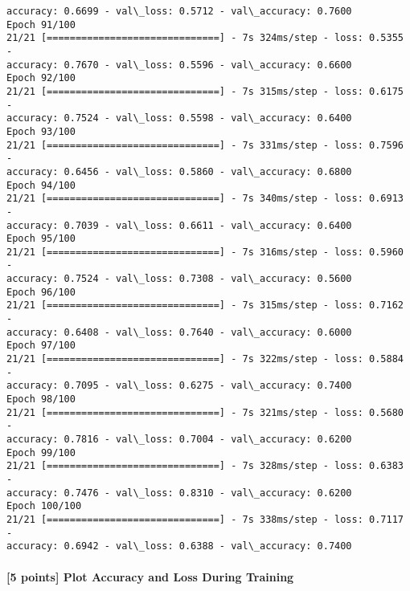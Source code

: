 \documentclass[11pt]{article}
\begin{document}
\begin{Verbatim}[commandchars=\\\{\}]
accuracy: 0.6699 - val\_loss: 0.5712 - val\_accuracy: 0.7600
Epoch 91/100
21/21 [==============================] - 7s 324ms/step - loss: 0.5355 -
accuracy: 0.7670 - val\_loss: 0.5596 - val\_accuracy: 0.6600
Epoch 92/100
21/21 [==============================] - 7s 315ms/step - loss: 0.6175 -
accuracy: 0.7524 - val\_loss: 0.5598 - val\_accuracy: 0.6400
Epoch 93/100
21/21 [==============================] - 7s 331ms/step - loss: 0.7596 -
accuracy: 0.6456 - val\_loss: 0.5860 - val\_accuracy: 0.6800
Epoch 94/100
21/21 [==============================] - 7s 340ms/step - loss: 0.6913 -
accuracy: 0.7039 - val\_loss: 0.6611 - val\_accuracy: 0.6400
Epoch 95/100
21/21 [==============================] - 7s 316ms/step - loss: 0.5960 -
accuracy: 0.7524 - val\_loss: 0.7308 - val\_accuracy: 0.5600
Epoch 96/100
21/21 [==============================] - 7s 315ms/step - loss: 0.7162 -
accuracy: 0.6408 - val\_loss: 0.7640 - val\_accuracy: 0.6000
Epoch 97/100
21/21 [==============================] - 7s 322ms/step - loss: 0.5884 -
accuracy: 0.7095 - val\_loss: 0.6275 - val\_accuracy: 0.7400
Epoch 98/100
21/21 [==============================] - 7s 321ms/step - loss: 0.5680 -
accuracy: 0.7816 - val\_loss: 0.7004 - val\_accuracy: 0.6200
Epoch 99/100
21/21 [==============================] - 7s 328ms/step - loss: 0.6383 -
accuracy: 0.7476 - val\_loss: 0.8310 - val\_accuracy: 0.6200
Epoch 100/100
21/21 [==============================] - 7s 338ms/step - loss: 0.7117 -
accuracy: 0.6942 - val\_loss: 0.6388 - val\_accuracy: 0.7400
    \end{Verbatim}

    \hypertarget{points-plot-accuracy-and-loss-during-training}{%
\paragraph{{[}5 points{]} Plot Accuracy and Loss During
Training}\label{points-plot-accuracy-and-loss-during-training}}
\end{document}
